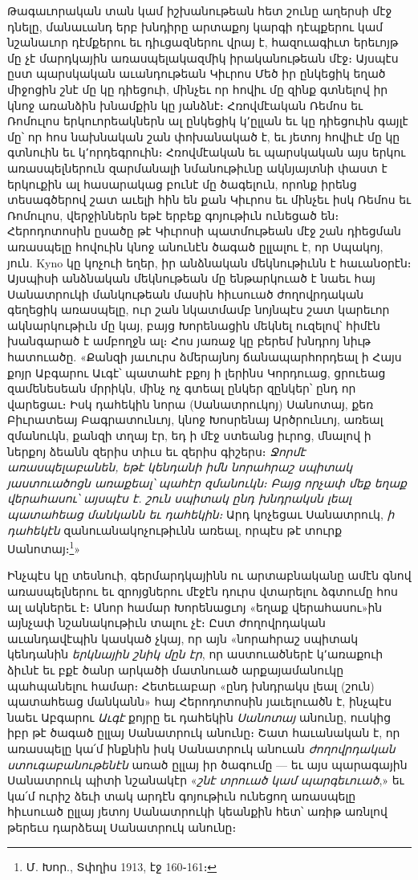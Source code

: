 \documentclass{article}
\begin{document}
{Թագաւորական տան կամ իշխանութեան հետ շունը աղերսի մէջ դնելը, մանաւանդ երբ խնդիրը արտաքոյ կարգի դէպքերու կամ նշանաւոր դէմքերու եւ դիւցազներու վրայ է, հազուագիւտ երեւոյթ մը չէ մարդկային առասպելակազմիկ իրականութեան մէջ։ Այսպէս ըստ պարսկական աւանդութեան Կիւրոս Մեծ իր ընկեցիկ եղած միջոցին շնէ մը կը դիեցուի, մինչեւ որ հովիւ մը զինք գտնելով իր կնոջ առանձին խնամքին կը յանձնէ։ Հռովմէական Ռեմոս եւ Ռոմուլոս երկուորեակներն ալ ընկեցիկ կ՚ըլլան եւ կը դիեցուին գայլէ մը՝ որ հոս նախնական շան փոխանակած է, եւ յետոյ հովիւէ մը կը գտնուին եւ կ՚որդեգրուին։ Հռովմէական եւ պարսկական այս երկու առասպելներուն զարմանալի նմանութիւնը ակնյայտնի փաստ է երկուքին ալ հասարակաց բունէ մը ծագելուն, որոնք իրենց տեսագծերով շատ աւելի հին են քան Կիւրոս եւ մինչեւ իսկ Ռեմոս եւ Ռոմուլոս, վերջիններն եթէ երբեք գոյութիւն ունեցած են։ Հերոդոտոսին ըսածը թէ Կիւրոսի պատմութեան մէջ շան դիեցման առասպելը հովուին կնոջ անունէն ծագած ըլլալու է, որ Սպակոյ, յուն. Kyno կը կոչուի եղեր, իր անձնական մեկնութիւնն է հաւանօրէն։ Այսպիսի անձնական մեկնութեան մը ենթարկուած է նաեւ հայ Սանատրուկի մանկութեան մասին հիւսուած ժողովրդական գեղեցիկ առասպելը, ուր շան նկատմամբ նոյնպէս շատ կարեւոր ակնարկութիւն մը կայ, բայց Խորենացին մեկնել ուզելով՝ հիմէն խանգարած է ամբողջն ալ։ Հոս յառաջ կը բերեմ խնդրոյ նիւթ հատուածը. «Քանզի յաւուրս ձմերայնոյ ճանապարհորդեալ ի Հայս քոյր Աբգարու Աւգէ՝ պատահէ բքոյ ի լերինս Կորդուաց, ցրուեաց զամենեսեան մրրիկն, մինչ ոչ գտեալ ընկեր զընկեր՝ ընդ որ վարեցաւ։ Իսկ դահեկին նորա (Սանատրուկոյ) Սանոտայ, քեռ Բիւրատեայ Բագրատունւոյ, կնոջ Խոսրենայ Արծրունւոյ, առեալ զմանուկն, քանզի տղայ էր, եդ ի մէջ ստեանց իւրոց, մնալով ի ներքոյ ձեանն զերիս տիւս եւ զերիս գիշերս։ \emph{Ջորմէ առասպելաբանեն, եթէ կենդանի իմն նորահրաշ սպիտակ յաստուածոցն առաքեալ՝ պահէր զմանուկն։ Բայց որչափ մեք եղաք վերահասու՝ այսպէս է. շուն սպիտակ ընդ խնդրակսն լեալ պատահեաց մանկանն եւ դահեկին։} Արդ կոչեցաւ Սանատրուկ, \emph{ի դահեկէն} զանուանակոչութիւնն առեալ, որպէս թէ տուրք Սանոտայ։\footnote{Մ. Խոր., Տփղիս 1913, էջ 160֊161։}»

Ինչպէս կը տեսնուի, գերմարդկայինն ու արտաբնականը ամէն գնով առասպելներու եւ զրոյցներու մէջէն դուրս վտարելու ձգտումը հոս ալ ակներեւ է։ Անոր համար Խորենացւոյ «եղաք վերահասու»ին այնչափ նշանակութիւն տալու չէ։ Ըստ ժողովրդական աւանդավէպին կասկած չկայ, որ այն «նորահրաշ սպիտակ կենդանին \emph{երկնային շնիկ մըն էր}, որ աստուածներէ կ՚առաքուի ձիւնէ եւ բքէ ծանր արկածի մատնուած արքայամանուկը պահպանելու համար։ Հետեւաբար «ընդ խնդրակս լեալ (շուն) պատահեաց մանկանն» հայ Հերոդոտոսին յաւելուածն է, ինչպէս նաեւ Աբգարու \emph{Աւգէ} քոյրը եւ դահեկին \emph{Սանոտայ} անունը, ուսկից իբր թէ ծագած ըլլայ Սանատրուկ անունը։ Շատ հաւանական է, որ առասպելը կա՛մ ինքնին իսկ Սանատրուկ անուան \emph{ժողովրդական ստուգաբանութենէն} առած ըլլայ իր ծագումը — եւ այս պարագային Սանատրուկ պիտի նշանակէր «\emph{շնէ տրուած կամ պարգեւուած},» եւ կա՛մ ուրիշ ձեւի տակ արդէն գոյութիւն ունեցող առասպելը հիւսուած ըլլայ յետոյ Սանատրուկի կեանքին հետ՝ առիթ առնլով թերեւս դարձեալ Սանատրուկ անունը։

}
\end{document}
